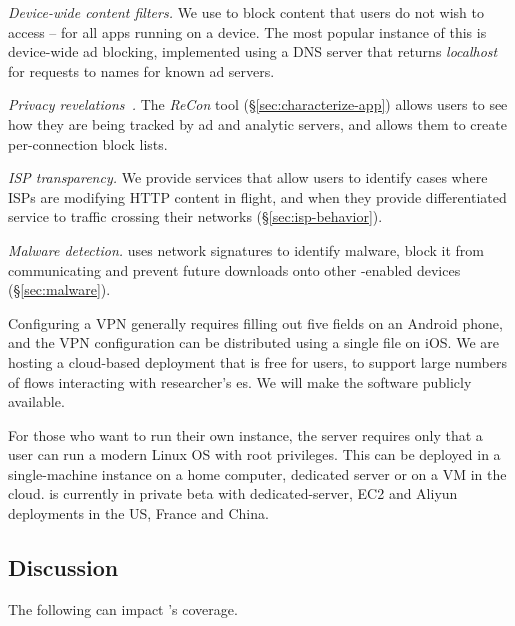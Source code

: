 \noindent \emph{Device-wide content filters.} We use \meddle to block content that users do 
not wish to access -- for all apps running on a device. The most popular instance of this is 
device-wide ad blocking, implemented using a DNS server that returns {\em localhost} for 
requests to names for known ad servers.

\noindent \emph{Privacy revelations~\cite{wetherall:revelations}.} The \emph{ReCon} tool (\S\ref{sec:characterize-app}) allows users to see how they are being 
tracked by ad and analytic servers, and allows them to create per-connection block lists.  

\noindent \emph{ISP transparency.} We provide services that allow users to identify cases where 
ISPs are modifying HTTP content in flight, and when they provide differentiated service to 
traffic crossing their networks (\S\ref{sec:isp-behavior}).

\noindent \emph{Malware detection.} \meddle uses network signatures to identify malware, block it from 
communicating and prevent future downloads onto other \meddle-enabled devices (\S\ref{sec:malware}).  

Configuring a VPN generally requires filling out five fields on an Android phone, and the VPN configuration can be distributed using a single file on iOS. 
We are hosting a cloud-based deployment that is free for users, to support large numbers 
of flows interacting with researcher's {\meddlebox}es. We will make 
the \meddle software publicly available.

For those who want to run their own \meddle instance, 
the \meddle server requires only that a user can run a modern Linux OS with root privileges. This can be deployed 
in a single-machine instance on a home computer, dedicated server or on a VM in the cloud. \meddle is currently in 
private beta with dedicated-server, EC2 and Aliyun deployments in the US, France and China. 



\subsection{Discussion}

The following can impact \meddle's coverage.

